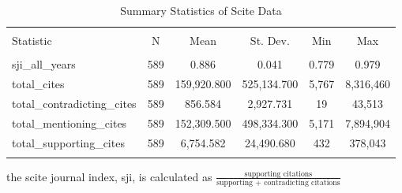 \documentclass[12pt,english]{article}
\begin{document}
\begin{table}[!htbp] \centering 
  \caption{Summary Statistics of Scite Data} 
  \label{tab:descriptives} 
\begin{tabular}{@{\extracolsep{5pt}}lccccc} 
\\[-1.8ex]\hline 
\hline \\[-1.8ex] 
Statistic & \multicolumn{1}{c}{N} & \multicolumn{1}{c}{Mean} & \multicolumn{1}{c}{St. Dev.} & \multicolumn{1}{c}{Min} & \multicolumn{1}{c}{Max} \\ 
\hline \\[-1.8ex] 
sji\_all\_years & 589 & 0.886 & 0.041 & 0.779 & 0.979 \\ 
total\_cites & 589 & 159,920.800 & 525,134.700 & 5,767 & 8,316,460 \\ 
total\_contradicting\_cites & 589 & 856.584 & 2,927.731 & 19 & 43,513 \\ 
total\_mentioning\_cites & 589 & 152,309.500 & 498,334.300 & 5,171 & 7,894,904 \\ 
total\_supporting\_cites & 589 & 6,754.582 & 24,490.680 & 432 & 378,043 \\ 
\hline \\[-1.8ex] 
\end{tabular} 
    \begin{tablenotes}
      \small
      \item * the scite journal index, sji, is calculated as $\frac{\text{supporting citations}}{\text{supporting + contradicting citations}}$
    \end{tablenotes}
\end{table} 
\end{document}
